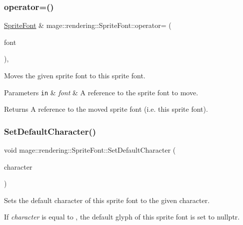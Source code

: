 \subsubsection{\texorpdfstring{operator=()}{operator=()}\hspace{0.1cm}{\footnotesize\ttfamily [2/2]}}
{\footnotesize\ttfamily \mbox{\hyperlink{classmage_1_1rendering_1_1_sprite_font}{Sprite\+Font}} \& mage\+::rendering\+::\+Sprite\+Font\+::operator= (\begin{DoxyParamCaption}\item[{\mbox{\hyperlink{classmage_1_1rendering_1_1_sprite_font}{Sprite\+Font}} \&\&}]{font }\end{DoxyParamCaption})\hspace{0.3cm}{\ttfamily [default]}, {\ttfamily [noexcept]}}

Moves the given sprite font to this sprite font.


\begin{DoxyParams}[1]{Parameters}
\mbox{\tt in}  & {\em font} & A reference to the sprite font to move. \\
\hline
\end{DoxyParams}
\begin{DoxyReturn}{Returns}
A reference to the moved sprite font (i.\+e. this sprite font). 
\end{DoxyReturn}
\mbox{\label{classmage_1_1rendering_1_1_sprite_font_a7400d0574c96e4e204268d6cd5a5c356}} 
\subsubsection{\texorpdfstring{Set\+Default\+Character()}{SetDefaultCharacter()}}
{\footnotesize\ttfamily void mage\+::rendering\+::\+Sprite\+Font\+::\+Set\+Default\+Character (\begin{DoxyParamCaption}\item[{wchar\+\_\+t}]{character }\end{DoxyParamCaption})}

Sets the default character of this sprite font to the given character.

If {\itshape character} is equal to {}, the default glyph of this sprite font is set to {\ttfamily nullptr}.


